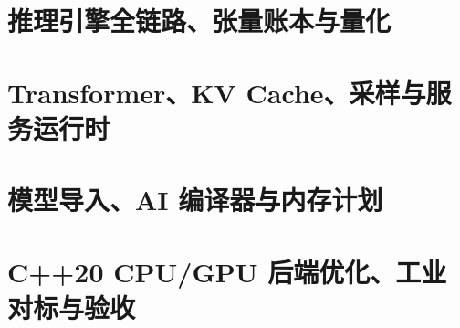 \documentclass[UTF8,openany,zihao=5,fontset=none]{ctexbook}
\begin{document}
\frontmatter




\tableofcontents

\mainmatter

\chapter{推理引擎全链路、张量账本与量化}









\chapter{Transformer、KV Cache、采样与服务运行时}







\chapter{模型导入、AI 编译器与内存计划}






\chapter{C++20 CPU/GPU 后端优化、工业对标与验收}








\appendix



\backmatter


\printindex
\end{document}
